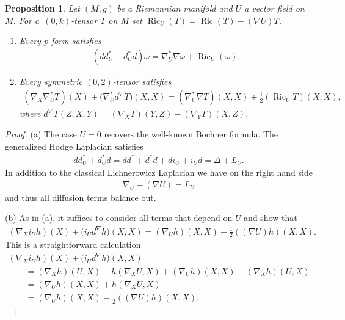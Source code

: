 \documentclass[10pt,a4paper]{amsart}
\numberwithin{equation}{section}
\newtheorem{Proposition}[Theorem]{Proposition}
{ \theoremstyle{definition}
\newtheorem{Remark}[Theorem]{Remark} }
\newcommand{\Ric} {\operatorname{Ric}}
\begin{document}
\begin{Proposition}\label{BochnerFormulasExample}
Let $(M,g)$ be a Riemannian manifold and $U$ a vector field on~$M$. For a~$(0,k)$-tensor $T$ on $M$ set $\Ric_U(T)=\Ric(T) - (\nabla U)T$.
\begin{enumerate}\itemsep=0pt
\item[$(a)$] Every $p$-form satisfies
\begin{gather*}
( d d^{*}_U + d^{*}_U d ) \omega = \nabla^{*}_U \nabla \omega + \Ric_U(\omega).
\end{gather*}
\item[$(b)$] Every symmetric $(0,2)$-tensor satisfies
\begin{gather*}
 ( \nabla_X \nabla^{*}_U T  )(X) + \big( \nabla^{*}_U d^{\nabla} T \big) (X,X) =  ( \nabla^{*}_U \nabla T  )(X,X)+ \frac{1}{2}  ( \Ric_U T  ) (X,X),
\end{gather*}
where $d^{\nabla}T(Z,X,Y)=  (\nabla_X T  )(Y,Z) - (\nabla_Y T )(X,Z)$.
\end{enumerate}
\end{Proposition}
\begin{proof}
(a) The case $U=0$ recovers the well-known Bochner formula. The generalized Hodge Laplacian satisfies
\begin{gather*}
d d^{*}_U + d^{*}_U d = d d^{*} + d^{*} d + d i_U + i_U d = \Delta + L_U.
\end{gather*}
In addition to the classical Lichnerowicz Laplacian we have on the right hand side
\begin{gather*}
\nabla_U - ( \nabla U ) = L_U
\end{gather*}
and thus all diffusion terms balance out.

(b) As in (a), it suffices to consider all terms that depend on $U$ and show that
\begin{gather*}
( \nabla_X i_U h ) (X) + \big( i_U d^{\nabla} h \big) (X,X) =  ( \nabla_U h ) (X,X) - \frac{1}{2} ( (\nabla U) h)(X,X).
\end{gather*}
This is a straightforward calculation
\begin{gather*}
 ( \nabla_X i_U h  ) (X)   + \big( i_U d^{\nabla} h \big) (X,X) \\
 \qquad{} =  ( \nabla_X h ) (U,X) + h ( \nabla_X U, X ) +  ( \nabla_U h ) (X,X) -  ( \nabla_ X h )  ( U, X  ) \\
\qquad{} =  ( \nabla_U h  ) (X,X) + h  ( \nabla_X U, X ) \\
\qquad{} =  ( \nabla_U h ) (X,X) - \frac{1}{2}  ( ( \nabla U ) h ) (X,X).\tag*{\qed}
\end{gather*}\renewcommand{\qed}{}
\end{proof}
\end{document}

